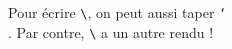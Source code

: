 \documentclass{article}
\newcommand{\myBackSlash}{\char`\\}
\begin{document}
Pour écrire \verb+\+, on peut aussi taper \texttt{\myBackSlash}.
Par contre, \texttt{\textbackslash} a un autre rendu !
\end{document}
